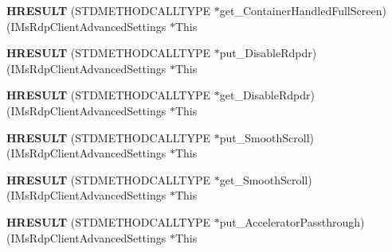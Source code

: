 \begin{DoxyCompactItemize}
\mbox{\label{struct_i_ms_rdp_client_advanced_settings_vtbl_acc2f011207e53d088731cfcff7f5ddd0}} 
{\bfseries H\+R\+E\+S\+U\+LT} (S\+T\+D\+M\+E\+T\+H\+O\+D\+C\+A\+L\+L\+T\+Y\+PE $\ast$get\+\_\+\+Container\+Handled\+Full\+Screen)(I\+Ms\+Rdp\+Client\+Advanced\+Settings $\ast$This
\item 
\mbox{\label{struct_i_ms_rdp_client_advanced_settings_vtbl_aa7242be4ace1d99f7cdfde475d4b5e1d}} 
{\bfseries H\+R\+E\+S\+U\+LT} (S\+T\+D\+M\+E\+T\+H\+O\+D\+C\+A\+L\+L\+T\+Y\+PE $\ast$put\+\_\+\+Disable\+Rdpdr)(I\+Ms\+Rdp\+Client\+Advanced\+Settings $\ast$This
\item 
\mbox{\label{struct_i_ms_rdp_client_advanced_settings_vtbl_a050b9cb3e06b18f7464e443854d50ae4}} 
{\bfseries H\+R\+E\+S\+U\+LT} (S\+T\+D\+M\+E\+T\+H\+O\+D\+C\+A\+L\+L\+T\+Y\+PE $\ast$get\+\_\+\+Disable\+Rdpdr)(I\+Ms\+Rdp\+Client\+Advanced\+Settings $\ast$This
\item 
\mbox{\label{struct_i_ms_rdp_client_advanced_settings_vtbl_a828160c02e2150009e408b023bace8b9}} 
{\bfseries H\+R\+E\+S\+U\+LT} (S\+T\+D\+M\+E\+T\+H\+O\+D\+C\+A\+L\+L\+T\+Y\+PE $\ast$put\+\_\+\+Smooth\+Scroll)(I\+Ms\+Rdp\+Client\+Advanced\+Settings $\ast$This
\item 
\mbox{\label{struct_i_ms_rdp_client_advanced_settings_vtbl_ad000ad0f469408be86941932c6eed029}} 
{\bfseries H\+R\+E\+S\+U\+LT} (S\+T\+D\+M\+E\+T\+H\+O\+D\+C\+A\+L\+L\+T\+Y\+PE $\ast$get\+\_\+\+Smooth\+Scroll)(I\+Ms\+Rdp\+Client\+Advanced\+Settings $\ast$This
\item 
\mbox{\label{struct_i_ms_rdp_client_advanced_settings_vtbl_a35b1140a0aef73c9dbda596022606fcc}} 
{\bfseries H\+R\+E\+S\+U\+LT} (S\+T\+D\+M\+E\+T\+H\+O\+D\+C\+A\+L\+L\+T\+Y\+PE $\ast$put\+\_\+\+Accelerator\+Passthrough)(I\+Ms\+Rdp\+Client\+Advanced\+Settings $\ast$This
\item 
\mbox{\label{struct_i_ms_rdp_client_advanced_settings_vtbl_af434c403b0b6fb97cc2a70d8dd3524a9}} 

\end{DoxyCompactItemize}
